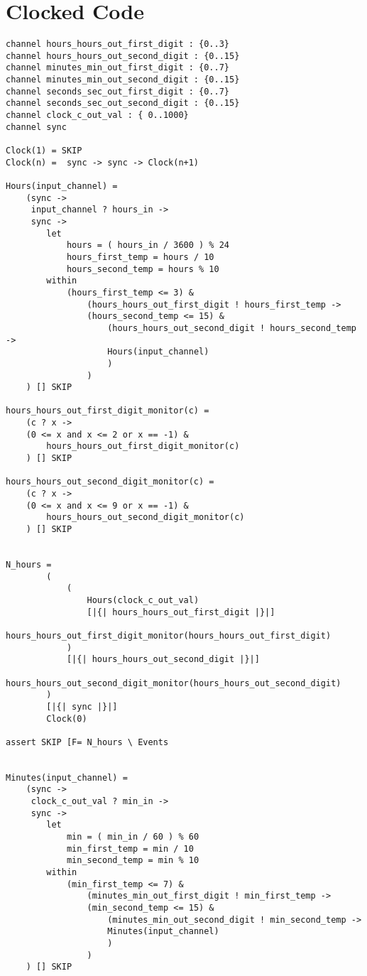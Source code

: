\section*{Clocked \cspm{} Code}
\begin{verbatim}
channel hours_hours_out_first_digit : {0..3}
channel hours_hours_out_second_digit : {0..15}
channel minutes_min_out_first_digit : {0..7}
channel minutes_min_out_second_digit : {0..15}
channel seconds_sec_out_first_digit : {0..7}
channel seconds_sec_out_second_digit : {0..15}
channel clock_c_out_val : { 0..1000}
channel sync

Clock(1) = SKIP
Clock(n) =  sync -> sync -> Clock(n+1)

Hours(input_channel) =
    (sync ->
     input_channel ? hours_in ->
     sync ->
        let
            hours = ( hours_in / 3600 ) % 24
            hours_first_temp = hours / 10
            hours_second_temp = hours % 10
        within
            (hours_first_temp <= 3) &
                (hours_hours_out_first_digit ! hours_first_temp ->
                (hours_second_temp <= 15) &
                    (hours_hours_out_second_digit ! hours_second_temp ->
                    Hours(input_channel)
                    )
                )
    ) [] SKIP

hours_hours_out_first_digit_monitor(c) =
    (c ? x ->
    (0 <= x and x <= 2 or x == -1) &
        hours_hours_out_first_digit_monitor(c)
    ) [] SKIP

hours_hours_out_second_digit_monitor(c) =
    (c ? x ->
    (0 <= x and x <= 9 or x == -1) &
        hours_hours_out_second_digit_monitor(c)
    ) [] SKIP


N_hours =
        (
            (
                Hours(clock_c_out_val)
                [|{| hours_hours_out_first_digit |}|]
                hours_hours_out_first_digit_monitor(hours_hours_out_first_digit)
            )
            [|{| hours_hours_out_second_digit |}|]
            hours_hours_out_second_digit_monitor(hours_hours_out_second_digit)
        )
        [|{| sync |}|]
        Clock(0)

assert SKIP [F= N_hours \ Events


Minutes(input_channel) =
    (sync ->
     clock_c_out_val ? min_in ->
     sync ->
        let
            min = ( min_in / 60 ) % 60
            min_first_temp = min / 10
            min_second_temp = min % 10
        within
            (min_first_temp <= 7) &
                (minutes_min_out_first_digit ! min_first_temp ->
                (min_second_temp <= 15) &
                    (minutes_min_out_second_digit ! min_second_temp ->
                    Minutes(input_channel)
                    )
                )
    ) [] SKIP


\end{verbatim}
